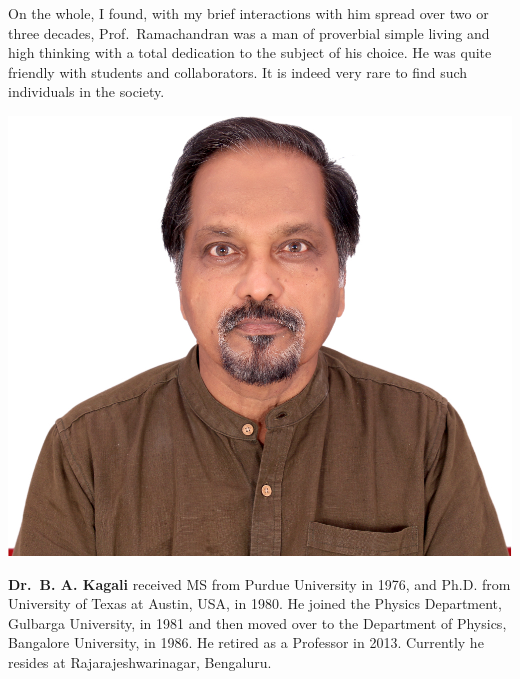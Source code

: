 On the whole, I found, with my brief interactions with him spread over two or three decades, Prof.\ Ramachandran was a man of proverbial simple living and high thinking with a total dedication to the subject of his choice. He was quite friendly with students and collaborators. It is indeed very rare to find such individuals in the society.
\bigskip

\drawline
\bigskip

\centerline{\includegraphics[scale=.6]{authorsphotos/Prof_B_A_Kagali.jpg}}
\bigskip

\noindent
{\biofntsize\textbf{Dr.\ B. A. Kagali} received MS from Purdue University in 1976, and Ph.D. from University of Texas at Austin, USA, in 1980. He joined the Physics Department, Gulbarga University, in 1981 and then moved over to the Department of Physics, Bangalore University, in 1986. He retired as a Professor in 2013. Currently he resides at Rajarajeshwarinagar, Bengaluru.}
